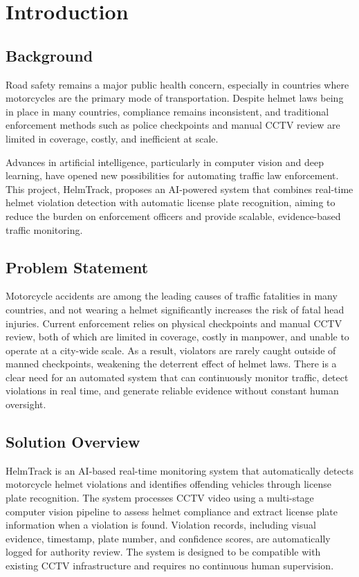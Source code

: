 \chapter{Introduction}
\label{chap:introduction}

\section{Background}
\label{section:background}

Road safety remains a major public health concern, especially in countries where motorcycles are the primary mode of transportation. Despite helmet laws being in place in many countries, compliance remains inconsistent, and traditional enforcement methods such as police checkpoints and manual CCTV review are limited in coverage, costly, and inefficient at scale.

Advances in artificial intelligence, particularly in computer vision and deep learning, have opened new possibilities for automating traffic law enforcement. This project, HelmTrack, proposes an AI-powered system that combines real-time helmet violation detection with automatic license plate recognition, aiming to reduce the burden on enforcement officers and provide scalable, evidence-based traffic monitoring.

\section{Problem Statement}
\label{section:problem-statement}

Motorcycle accidents are among the leading causes of traffic fatalities in many countries, and not wearing a helmet significantly increases the risk of fatal head injuries. Current enforcement relies on physical checkpoints and manual CCTV review, both of which are limited in coverage, costly in manpower, and unable to operate at a city-wide scale. As a result, violators are rarely caught outside of manned checkpoints, weakening the deterrent effect of helmet laws. There is a clear need for an automated system that can continuously monitor traffic, detect violations in real time, and generate reliable evidence without constant human oversight.

\section{Solution Overview}
\label{section:solution-overview}

HelmTrack is an AI-based real-time monitoring system that automatically detects motorcycle helmet violations and identifies offending vehicles through license plate recognition. The system processes CCTV video using a multi-stage computer vision pipeline to assess helmet compliance and extract license plate information when a violation is found. Violation records, including visual evidence, timestamp, plate number, and confidence scores, are automatically logged for authority review. The system is designed to be compatible with existing CCTV infrastructure and requires no continuous human supervision.

